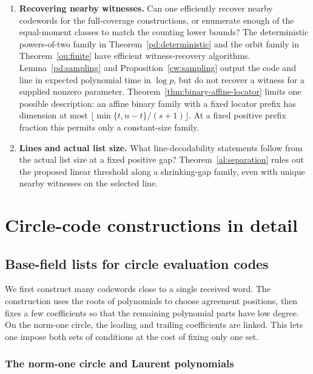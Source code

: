 \documentclass[11pt,letterpaper]{article}
\theoremstyle{definition}
\theoremstyle{remark}
\begin{document}
\begin{enumerate}
uniqueness with a linear lower bound on the nearby count.
\item \textbf{Recovering nearby witnesses.}
Can one efficiently recover nearby codewords for the full-coverage
constructions, or enumerate enough of the equal-moment classes to match
the counting lower bounds? The deterministic powers-of-two family in
Theorem~\ref{pd:deterministic} and the orbit family in
Theorem~\ref{ou:finite} have efficient witness-recovery algorithms. Lemma~\ref{pd:sampling} and Proposition~\ref{cw:sampling}
output the code and line in expected polynomial time in $\log p$, but
do not recover a witness
for a supplied nonzero parameter.
Theorem~\ref{thm:binary-affine-locator} limits one possible description:
an affine binary family with a fixed locator prefix has dimension at
most $\lfloor\min\{t,n-t\}/(s+1)\rfloor$. At a fixed positive
prefix fraction this permits only a constant-size family.
\item \textbf{Lines and actual list size.}
What line-decodability statements follow from the actual list size
at a fixed positive gap? Theorem~\ref{al:separation} rules out the
proposed linear threshold along a shrinking-gap family, even with
unique nearby witnesses on the selected line.
\end{enumerate}


\appendix
\section{Circle-code constructions in detail}\label{app:circle}
\subsection{Base-field lists for circle evaluation codes}
\label{rl:section}

We first construct many codewords close to a single received word. The
construction uses the roots of polynomials to choose agreement positions,
then fixes a few coefficients so that the remaining polynomial parts have
low degree. On the norm-one circle, the leading and trailing coefficients
are linked. This lets one impose both sets of conditions at the cost of
fixing only one set.

\subsubsection{The norm-one circle and Laurent polynomials}
\label{sec:circle-elementary-preliminaries}
\end{document}

